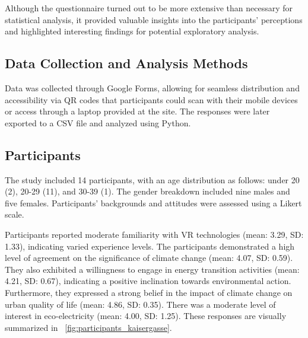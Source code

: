 \documentclass[draft, final]{vutinfth} %
\begin{document}
Although the questionnaire turned out to be more extensive than necessary for statistical analysis, it provided valuable insights into the participants' perceptions and highlighted interesting findings for potential exploratory analysis.

\subsection{Data Collection and Analysis Methods}
Data was collected through Google Forms, allowing for seamless distribution and accessibility via QR codes that participants could scan with their mobile devices or access through a laptop provided at the site. The responses were later exported to a CSV file and analyzed using Python.

\subsection{Participants}
The study included 14 participants, with an age distribution as follows: under 20 (2), 20-29 (11), and 30-39 (1). The gender breakdown included nine males and five females. Participants' backgrounds and attitudes were assessed using a Likert scale.

Participants reported moderate familiarity with VR technologies (mean: 3.29, SD: 1.33), indicating varied experience levels. The participants demonstrated a high level of agreement on the significance of climate change (mean: 4.07, SD: 0.59). They also exhibited a willingness to engage in energy transition activities (mean: 4.21, SD: 0.67), indicating a positive inclination towards environmental action. Furthermore, they expressed a strong belief in the impact of climate change on urban quality of life (mean: 4.86, SD: 0.35). There was a moderate level of interest in eco-electricity (mean: 4.00, SD: 1.25). These responses are visually summarized in \figurename~\ref{fig:participants_kaisergasse}.
\end{document}
